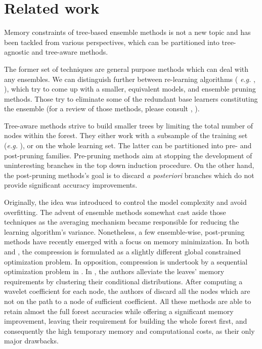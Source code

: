 \documentclass{article}
\begin{document}
\section{Related work}
\label{sec:relatedWork}
Memory constraints of tree-based ensemble methods is not a new topic and has 
been tackled from various perspectives, which can be partitioned into 
tree-agnostic and tree-aware methods.

The former set of techniques are general purpose methods which can deal with  
any ensembles. We can distinguish further between re-learning algorithms ({\it 
e.g.} \citet{domingos1997oracle}, \citet{menke2009oracle}), which try to come 
up with a smaller, equivalent models, and ensemble pruning methods. Those try 
to eliminate some of the redundant base learners constituting the ensemble (for 
a review of those methods, please consult \citet{tsoumakas2008enspruning}, 
\citet{rokach2016enspruning}). 

Tree-aware methods strive to build smaller trees by limiting the total number 
of nodes within the forest. They either work with a subsample of the training 
set ({\it e.g.} \citet{breiman1999pasting}), or on the whole learning set. The 
latter can be partitioned into pre- and post-pruning families. 
Pre-pruning methods aim at stopping the development of uninteresting branches 
in the top down induction procedure. On the other hand, the post-pruning 
methods's goal is to discard {\it a posteriori} branches which do not provide 
significant accuracy improvements.

Originally, the idea was introduced to control the model complexity and avoid 
overfitting. The advent of ensemble methods somewhat cast aside those 
techniques as the averaging mechanism became responsible for reducing the 
learning algorithm's variance. Nonetheless, a few ensemble-wise, post-pruning 
methods have recently emerged with a focus on memory minimization. In both 
\citet{meinshausen2009forestgarrote} and \citet{l1basedcomp}, the compression 
is formulated as a slightly different global constrained optimization problem. 
In opposition, compression is undertook by a sequential optimization problem in 
\citet{ren2015glorefinement}.
In \citet{vleeschouwer2015mitimemreq}, the authors alleviate the leaves' memory 
requirements by clustering their conditional distributions. After computing a 
wavelet coefficient for each node, the authors of \citet{elisha2016wavelet} 
discard all the nodes which are not on the path to a node of sufficient 
coefficient.
All these methods are able to retain almost the full forest accuracies while 
offering a significant memory improvement, leaving their requirement for 
building the whole forest first, and consequently the high temporary memory and 
computational costs, as their only major drawbacks.
\end{document}
